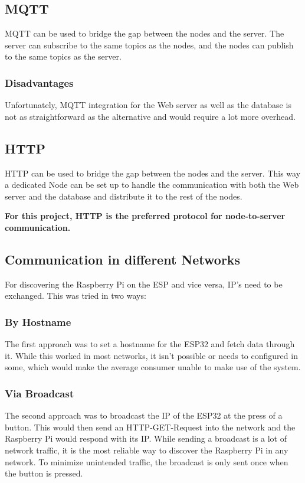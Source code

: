     \subsection{MQTT}
    MQTT can be used to bridge the gap between the nodes and the server.
    The server can subscribe to the same topics as the nodes, and the nodes
    can publish to the same topics as the server.

        \subsubsection{Disadvantages}
        Unfortunately, MQTT integration for the Web server as well as the database
        is not as straightforward as the alternative and would require a lot more 
        overhead.

    \subsection{HTTP}
    HTTP can be used to bridge the gap between the nodes and the server.
    This way a dedicated Node can be set up to handle the communication
    with both the Web server and the database and distribute it to the 
    rest of the nodes.

    \vspace{1cm}
    \textbf{For this project, HTTP is the preferred protocol for 
    node-to-server communication.}

    \subsection{Communication in different Networks}
    For discovering the Raspberry Pi on the ESP and vice versa,
    IP's need to be exchanged. This was tried in two ways:
        \subsubsection{By Hostname}
        The first approach was to set a hostname for the 
        ESP32 and fetch data through it. While this worked
        in most networks, it isn't possible or needs to 
        configured in some, which would make the average 
        consumer unable to make use of the system.

        \subsubsection{Via Broadcast}
        The second approach was to broadcast the IP of the ESP32
        at the press of a button. This would then send an 
        HTTP-GET-Request into the network and the Raspberry Pi
        would respond with its IP. While sending a broadcast is
        a lot of network traffic, it is the most reliable way
        to discover the Raspberry Pi in any network. To minimize
        unintended traffic, the broadcast is only sent once when the
        button is pressed.
        

